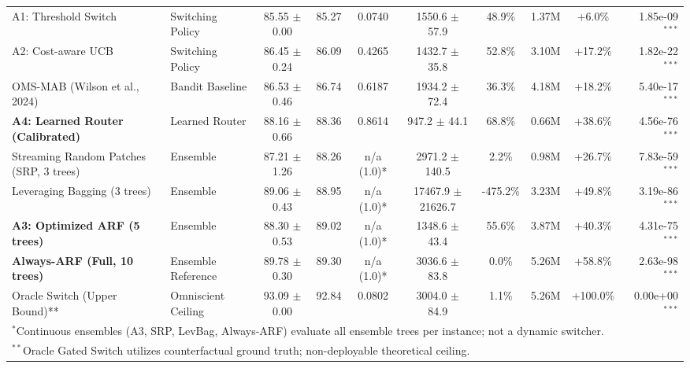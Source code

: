 \begin{table}[t]
\begin{tabular}{llcccccccr}
A1: Threshold Switch & Switching Policy & 85.55 $\pm$ 0.00 & 85.27 & 0.0740 & 1550.6 $\pm$ 57.9 & 48.9\% & 1.37M & +6.0\% & 1.85e-09$^{***}$ \\
A2: Cost-aware UCB & Switching Policy & 86.45 $\pm$ 0.24 & 86.09 & 0.4265 & 1432.7 $\pm$ 35.8 & 52.8\% & 3.10M & +17.2\% & 1.82e-22$^{***}$ \\
OMS-MAB (Wilson et al., 2024) & Bandit Baseline & 86.53 $\pm$ 0.46 & 86.74 & 0.6187 & 1934.2 $\pm$ 72.4 & 36.3\% & 4.18M & +18.2\% & 5.40e-17$^{***}$ \\
\textbf{A4: Learned Router (Calibrated)} & Learned Router & 88.16 $\pm$ 0.66 & 88.36 & 0.8614 & 947.2 $\pm$ 44.1 & 68.8\% & 0.66M & +38.6\% & 4.56e-76$^{***}$ \\
Streaming Random Patches (SRP, 3 trees) & Ensemble & 87.21 $\pm$ 1.26 & 88.26 & n/a (1.0)* & 2971.2 $\pm$ 140.5 & 2.2\% & 0.98M & +26.7\% & 7.83e-59$^{***}$ \\
Leveraging Bagging (3 trees) & Ensemble & 89.06 $\pm$ 0.43 & 88.95 & n/a (1.0)* & 17467.9 $\pm$ 21626.7 & -475.2\% & 3.23M & +49.8\% & 3.19e-86$^{***}$ \\
\textbf{A3: Optimized ARF (5 trees)} & Ensemble & 88.30 $\pm$ 0.53 & 89.02 & n/a (1.0)* & 1348.6 $\pm$ 43.4 & 55.6\% & 3.87M & +40.3\% & 4.31e-75$^{***}$ \\
\textbf{Always-ARF (Full, 10 trees)} & Ensemble Reference & 89.78 $\pm$ 0.30 & 89.30 & n/a (1.0)* & 3036.6 $\pm$ 83.8 & 0.0\% & 5.26M & +58.8\% & 2.63e-98$^{***}$ \\
Oracle Switch (Upper Bound)** & Omniscient Ceiling & 93.09 $\pm$ 0.00 & 92.84 & 0.0802 & 3004.0 $\pm$ 84.9 & 1.1\% & 5.26M & +100.0\% & 0.00e+00$^{***}$ \\
\bottomrule
\multicolumn{10}{l}{\footnotesize $^*$Continuous ensembles (A3, SRP, LevBag, Always-ARF) evaluate all ensemble trees per instance; not a dynamic switcher.} \\
\multicolumn{10}{l}{\footnotesize $^{**}$Oracle Gated Switch utilizes counterfactual ground truth; non-deployable theoretical ceiling.}
\end{tabular}
\end{table}